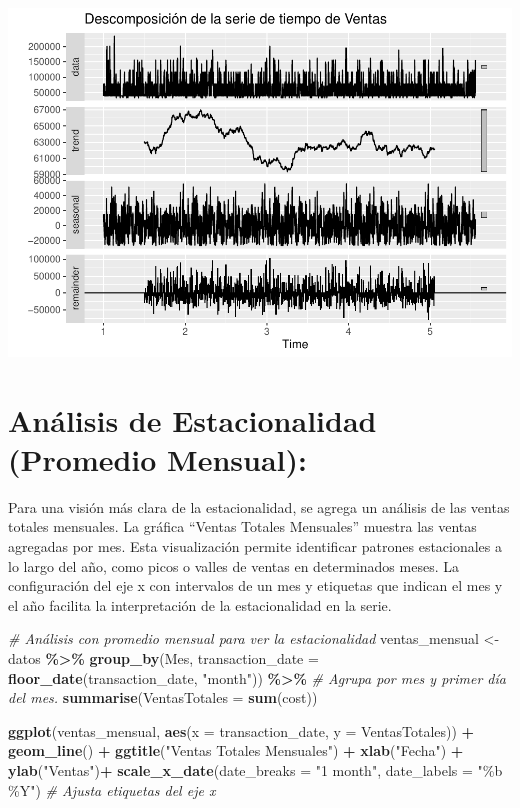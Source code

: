 \documentclass[
]{book}
\newenvironment{Shaded}{\begin{snugshade}}{\end{snugshade}}
\newcommand{\AttributeTok}[1]{\textcolor[rgb]{0.13,0.29,0.53}{#1}}
\newcommand{\CommentTok}[1]{\textcolor[rgb]{0.56,0.35,0.01}{\textit{#1}}}
\newcommand{\FunctionTok}[1]{\textcolor[rgb]{0.13,0.29,0.53}{\textbf{#1}}}
\newcommand{\NormalTok}[1]{#1}
\newcommand{\OtherTok}[1]{\textcolor[rgb]{0.56,0.35,0.01}{#1}}
\newcommand{\SpecialCharTok}[1]{\textcolor[rgb]{0.81,0.36,0.00}{\textbf{#1}}}
\newcommand{\StringTok}[1]{\textcolor[rgb]{0.31,0.60,0.02}{#1}}
\begin{document}
\includegraphics{_main_files/figure-latex/unnamed-chunk-9-1.pdf}

\section{Análisis de Estacionalidad (Promedio Mensual):}\label{anuxe1lisis-de-estacionalidad-promedio-mensual}

Para una visión más clara de la estacionalidad, se agrega un análisis de las ventas totales mensuales. La gráfica ``Ventas Totales Mensuales'' muestra las ventas agregadas por mes. Esta visualización permite identificar patrones estacionales a lo largo del año, como picos o valles de ventas en determinados meses. La configuración del eje x con intervalos de un mes y etiquetas que indican el mes y el año facilita la interpretación de la estacionalidad en la serie.

\begin{Shaded}
\begin{Highlighting}[]
\CommentTok{\# Análisis con promedio mensual para ver la estacionalidad}
\NormalTok{ventas\_mensual }\OtherTok{\textless{}{-}}\NormalTok{ datos }\SpecialCharTok{\%\textgreater{}\%}
  \FunctionTok{group\_by}\NormalTok{(Mes, }\AttributeTok{transaction\_date =} \FunctionTok{floor\_date}\NormalTok{(transaction\_date, }\StringTok{"month"}\NormalTok{)) }\SpecialCharTok{\%\textgreater{}\%} \CommentTok{\# Agrupa por mes y primer día del mes.}
  \FunctionTok{summarise}\NormalTok{(}\AttributeTok{VentasTotales =} \FunctionTok{sum}\NormalTok{(cost))}

\FunctionTok{ggplot}\NormalTok{(ventas\_mensual, }\FunctionTok{aes}\NormalTok{(}\AttributeTok{x =}\NormalTok{ transaction\_date, }\AttributeTok{y =}\NormalTok{ VentasTotales)) }\SpecialCharTok{+}
  \FunctionTok{geom\_line}\NormalTok{() }\SpecialCharTok{+}
  \FunctionTok{ggtitle}\NormalTok{(}\StringTok{"Ventas Totales Mensuales"}\NormalTok{) }\SpecialCharTok{+}
  \FunctionTok{xlab}\NormalTok{(}\StringTok{"Fecha"}\NormalTok{) }\SpecialCharTok{+} \FunctionTok{ylab}\NormalTok{(}\StringTok{"Ventas"}\NormalTok{)}\SpecialCharTok{+}
  \FunctionTok{scale\_x\_date}\NormalTok{(}\AttributeTok{date\_breaks =} \StringTok{"1 month"}\NormalTok{, }\AttributeTok{date\_labels =} \StringTok{"\%b \%Y"}\NormalTok{) }\CommentTok{\# Ajusta etiquetas del eje x}
\end{Highlighting}
\end{Shaded}
\end{document}
